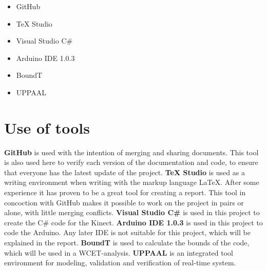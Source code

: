 \begin{itemize}
	\item GitHub
	\item TeX Studio
	\item Visual Studio C\#
	\item Arduino IDE 1.0.3
	\item BoundT
	\item UPPAAL
\end{itemize}


\section*{Use of tools}
\textbf{GitHub} is used with the intention of merging and sharing documents. This tool is also used here to verify each version of the documentation and code, to ensure that everyone has the latest update of the project.\newline
\textbf{TeX Studio} is used as a writing environment when writing with the markup language LaTeX. After some experience it has proven to be a great tool for creating a report. This tool in concoction with GitHub makes it possible to work on the project in pairs or alone, with little merging conflicts. \newline
\textbf{Visual Studio C\#} is used in this project to create the C\# code for the Kinect. \newline
\textbf{Arduino IDE 1.0.3} is used in this project to code the Arduino. Any later IDE is not suitable for this project, which will be explained in the report. \newline
\textbf{BoundT} is used to calculate the bounds of the code, which will be used in a WCET-analysis. \citep{boundt} \newline
\textbf{UPPAAL} is an integrated tool environment for modeling, validation and verification of real-time system. \citep{uppaal}


